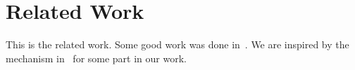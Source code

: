 \section{Related Work}
\label{sec:related-work}

This is the related work. Some good work was done in~\cite{vaswani2017attention}. We are inspired by the mechanism in~\cite{he2016deep} for some part in our work.

